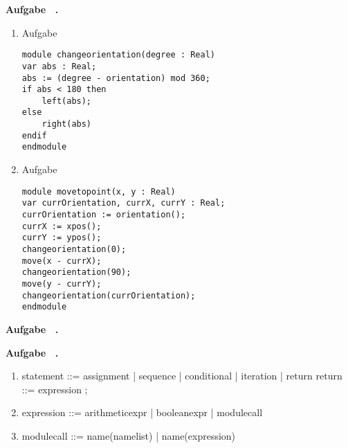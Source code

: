 \documentclass[a4paper,11pt]{article}             %
\def\vblatt{~}
\newcommand{\lstjava}{\lstset { numbers=left,language=java,tabsize=2,numberstyle=\tiny ,numbersep=5pt,basicstyle=\scriptsize}}
\newcommand{\lstalg}{\lstset { numbers=left,language=alglang,tabsize=2,numberstyle=\tiny,style=algstyle}}
\newcounter{aufgabe}
\newcommand{\Aufgabe}{\noindent\newline\addtocounter{aufgabe}{1}\textbf{Aufgabe \vblatt.\theaufgabe}\\
}
\begin{document}
\Aufgabe
\begin{enumerate}

\item Aufgabe


\lstalg
\begin{lstlisting}
module changeorientation(degree : Real)
var abs : Real;
abs := (degree - orientation) mod 360;
if abs < 180 then
	left(abs);
else
	right(abs)
endif
endmodule
\end{lstlisting}

\item Aufgabe


\lstalg
\begin{lstlisting}
module movetopoint(x, y : Real)
var currOrientation, currX, currY : Real;
currOrientation := orientation();
currX := xpos();
currY := ypos();
changeorientation(0);
move(x - currX);
changeorientation(90);
move(y - currY);
changeorientation(currOrientation);
endmodule
\end{lstlisting}

\end{enumerate}

\Aufgabe
\lstjava


\Aufgabe
\begin{enumerate}
\item \subitem statement ::= assignment | sequence | conditional | iteration | return
\subitem return ::= expression ;
\item expression ::= arithmeticexpr | booleanexpr | modulecall 
\item modulecall ::= name(namelist) | name(expression)
\end{enumerate}
\end{document}
